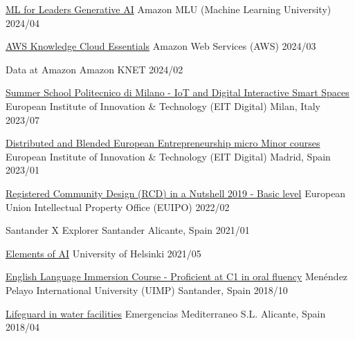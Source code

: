 \begin{cvcerts}
	\cvcert
	{\href{https://aws.amazon.com/machine-learning/mlu/?nc1=h_ls}{ML for Leaders Generative AI}} %
	{Amazon MLU (Machine Learning University)} %
	{} %
	{2024/04} %

	\cvcert
	{\href{https://www.credly.com/badges/7da96cd9-1320-41f2-912d-9eda06081e23/public_url}{AWS Knowledge Cloud Essentials}} %
	{Amazon Web Services (AWS)} %
	{} %
	{2024/03} %
	
	\cvcert
	{Data at Amazon} %
	{Amazon KNET} %
	{} %
	{2024/02} %
		
	\cvcertl
	{\href{https://1drv.ms/b/s!AkPthURenJLHi8VwxViOEyun28FUSQ?e=pmHmht}{Summer School Politecnico di Milano - IoT and Digital Interactive Smart Spaces}} %
	{European Institute of Innovation \& Technology (EIT Digital)} %
	{Milan, Italy} %
	{2023/07} %
	
	\cvcertl
	{\href{https://1drv.ms/b/s!AkPthURenJLHi8Vv_LR_7tQx06e70A?e=2RH5ut}{Distributed and Blended European Entrepreneurship micro Minor courses}} %
	{European Institute of Innovation \& Technology (EIT Digital)} %
	{Madrid, Spain} %
	{2023/01} %
		
	\cvcertl
	{\href{https://1drv.ms/b/s!AkPthURenJLHi8VrvSI_c4n7xcJCYQ?e=RW9j9U}{Registered Community Design (RCD) in a Nutshell 2019 - Basic level}} %
	{European Union Intellectual Property Office (EUIPO)} %
	{} %
	{2022/02} %
			
	\cvcert
	{Santander X Explorer} %
	{Santander} %
	{Alicante, Spain} %
	{2021/01} %
				
	\cvcert
	{\href{https://1drv.ms/b/s!AkPthURenJLHi8VsA1LqmEh4eUHdwg?e=kSERNG}{Elements of AI}} %
	{University of Helsinki} %
	{} %
	{2021/05} %
			
	\cvcertl
	{\href{https://1drv.ms/b/s!AkPthURenJLHi8Vx6tme1nLdTLFksw?e=fgHyIm}{English Language Immersion Course - Proficient at C1 in oral fluency}} %
	{Menéndez Pelayo International University (UIMP)} %
	{Santander, Spain} %
	{2018/10} %
				
	\cvcertl
	{\href{https://1drv.ms/b/s!AkPthURenJLHi8VyUpFrgflu8ICUhw?e=OLzRDm}{Lifeguard in water facilities}} %
	{Emergencias Mediterraneo S.L.} %
	{Alicante, Spain} %
	{2018/04} %
	
\end{cvcerts}
